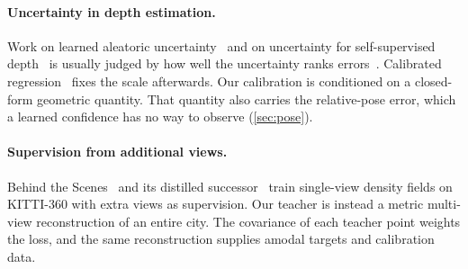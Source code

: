 \paragraph{Uncertainty in depth estimation.}
Work on learned aleatoric uncertainty~\cite{kendall2017uncertainties} and on uncertainty for
self-supervised depth~\cite{poggi2020uncertainty} is usually judged by how well the uncertainty ranks
errors~\cite{ilg2018uncertainty}. Calibrated regression~\cite{kuleshov2018calibrated} fixes the
scale afterwards. Our calibration is conditioned on a closed-form geometric quantity. That quantity
also carries the relative-pose error, which a learned confidence has no way to observe
(\cref{sec:pose}).

\paragraph{Supervision from additional views.}
Behind the Scenes~\cite{wimbauer2023bts} and its distilled successor~\cite{han2024kdbts} train
single-view density fields on KITTI-360 with extra views as supervision. Our teacher is instead a
metric multi-view reconstruction of an entire city. The covariance of each teacher point weights the
loss, and the same reconstruction supplies amodal targets and calibration data.
